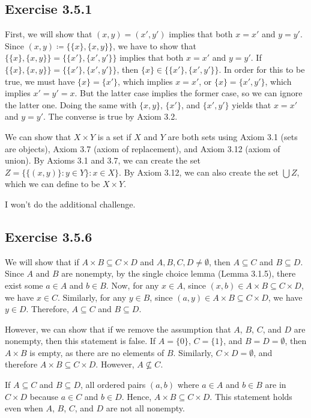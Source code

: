 \documentclass[12pt, oneside]{book}
\begin{document}
	\subsection*{Exercise 3.5.1}
	
	First, we will show that $(x, y) = (x', y')$ implies that both $x = x'$ and $y = y'$. Since $(x, y) \coloneqq \{\{x\}, \{x, y\}\}$, we have to show that $\{\{x\}, \{x, y\}\} = \{\{x'\}, \{x', y'\}\}$ implies that both $x = x'$ and $y = y'$. If $\{\{x\}, \{x, y\}\} = \{\{x'\}, \{x', y'\}\}$, then $\{x\} \in \{\{x'\}, \{x', y'\}\}$. In order for this to be true, we must have $\{x\} = \{x'\}$, which implies $x = x'$, or $\{x\} = \{x', y'\}$, which implies $x' = y' = x$. But the latter case implies the former case, so we can ignore the latter one. Doing the same with $\{x, y\}$, $\{x'\}$, and $\{x', y'\}$ yields that $x = x'$ and $y = y'$. The converse is true by Axiom 3.2.
	
	We can show that $X \times Y$ is a set if $X$ and $Y$ are both sets using Axiom 3.1 (sets are objects), Axiom 3.7 (axiom of replacement), and Axiom 3.12 (axiom of union). By Axioms 3.1 and 3.7, we can create the set $Z = \{\{(x, y)\}: y \in Y\}: x \in X\}$. By Axiom 3.12, we can also create the set $\bigcup Z$, which we can define to be $X \times Y$.
	
	I won't do the additional challenge.
	
	\subsection*{Exercise 3.5.6}
	
	We will show that if $A \times B \subseteq C \times D$ and $A, B, C, D \ne \emptyset$, then $A \subseteq C$ and $B \subseteq D$. Since $A$ and $B$ are nonempty, by the single choice lemma (Lemma 3.1.5), there exist some $a \in A$ and $b \in B$. Now, for any $x \in A$, since $(x, b) \in A \times B \subseteq C \times D$, we have $x \in C$. Similarly, for any $y \in B$, since $(a, y) \in A \times B \subseteq C \times D$, we have $y \in D$. Therefore, $A \subseteq C$ and $B \subseteq D$.
	
	However, we can show that if we remove the assumption that $A$, $B$, $C$, and $D$ are nonempty, then this statement is false. If $A = \{0\}$, $C = \{1\}$, and $B = D = \emptyset$, then $A \times B$ is empty, as there are no elements of $B$. Similarly, $C \times D = \emptyset$, and therefore $A \times B \subseteq C \times D$. However, $A \not \subseteq C$.
	
	If $A \subseteq C$ and $B \subseteq D$, all ordered pairs $(a, b)$ where $a \in A$ and $b \in B$ are in $C \times D$ because $a \in C$ and $b \in D$. Hence, $A \times B \subseteq C \times D$. This statement holds even when $A$, $B$, $C$, and $D$ are not all nonempty.
	
\end{document}
